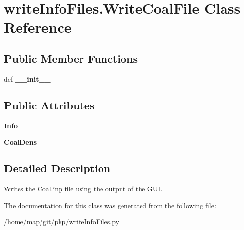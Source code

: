 \hypertarget{classwriteInfoFiles_1_1WriteCoalFile}{\section{write\-Info\-Files.\-Write\-Coal\-File \-Class \-Reference}
\label{classwriteInfoFiles_1_1WriteCoalFile}
}
\subsection*{\-Public \-Member \-Functions}
\begin{DoxyCompactItemize}
\item 
\hypertarget{classwriteInfoFiles_1_1WriteCoalFile_a844c541c3b090f966e13096b40f07946}{def {\bfseries \-\_\-\-\_\-init\-\_\-\-\_\-}}\label{classwriteInfoFiles_1_1WriteCoalFile_a844c541c3b090f966e13096b40f07946}

\end{DoxyCompactItemize}
\subsection*{\-Public \-Attributes}
\begin{DoxyCompactItemize}
\item 
\hypertarget{classwriteInfoFiles_1_1WriteCoalFile_aaaa57e230cb7770b54d26e5ee104b17d}{{\bfseries \-Info}}\label{classwriteInfoFiles_1_1WriteCoalFile_aaaa57e230cb7770b54d26e5ee104b17d}

\item 
\hypertarget{classwriteInfoFiles_1_1WriteCoalFile_a766894d7f53aad4d1abd6ab5c8a4da3f}{{\bfseries \-Coal\-Dens}}\label{classwriteInfoFiles_1_1WriteCoalFile_a766894d7f53aad4d1abd6ab5c8a4da3f}

\end{DoxyCompactItemize}


\subsection{\-Detailed \-Description}
\begin{DoxyVerb}Writes the Coal.inp file using the output of the GUI.\end{DoxyVerb}
 

\-The documentation for this class was generated from the following file\-:\begin{DoxyCompactItemize}
\item 
/home/map/git/pkp/write\-Info\-Files.\-py\end{DoxyCompactItemize}
